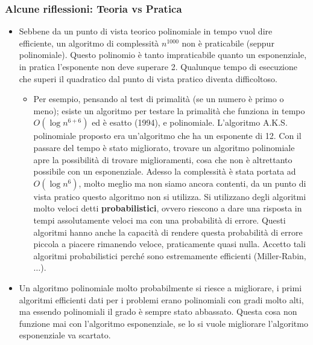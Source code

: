 \documentclass{article}
\begin{document}
\subsubsection{Alcune riflessioni: Teoria vs Pratica}
\begin{itemize}
    \item Sebbene da un punto di vista teorico polinomiale in tempo vuol dire efficiente,
    un algoritmo di complessità $n^{1000}$ non è praticabile (seppur polinomiale).
    Questo polinomio è tanto impraticabile quanto un esponenziale, in pratica l'esponente non
    deve superare 2. Qualunque tempo di esecuzione che superi il quadratico dal punto
    di vista pratico diventa difficoltoso.
    \begin{itemize}
        \item Per esempio, pensando al test di primalità (se un numero è primo o meno); esiste
        un algoritmo per testare la primalità che funziona in tempo $O(\log n^{6+6})$ ed
        è esatto (1994), e polinomiale. L'algoritmo A.K.S. polinomiale proposto era un'algoritmo
        che ha un esponente di 12. Con il passare del tempo è stato migliorato, trovare un
        algoritmo polinomiale apre la possibilità di trovare miglioramenti, cosa che non è
        altrettanto possibile con un esponenziale. Adesso la complessità è stata portata
        ad $O(\log n^6)$, molto meglio ma non siamo ancora contenti, da un punto di vista
        pratico questo algoritmo non si utilizza. Si utilizzano degli algoritmi molto veloci detti
        \textbf{probabilistici}, ovvero riescono a dare una risposta in tempi assolutamente veloci ma con una
        probabilità di errore. Questi algoritmi hanno anche la capacità di rendere questa probabilità
        di errore piccola a piacere rimanendo veloce, praticamente quasi nulla. Accetto tali algoritmi
        probabilistici perché sono estremamente efficienti (Miller-Rabin, $\dots$).
    \end{itemize}

    \item  Un algoritmo polinomiale molto probabilmente si riesce a migliorare, i primi algoritmi
    efficienti dati per i problemi erano polinomiali con gradi molto alti, ma essendo polinomiali
    il grado è sempre stato abbassato. Questa cosa non funzione mai con l'algoritmo esponenziale,
    se lo si vuole migliorare l'algoritmo esponenziale va scartato.


\end{itemize}
\end{document}

